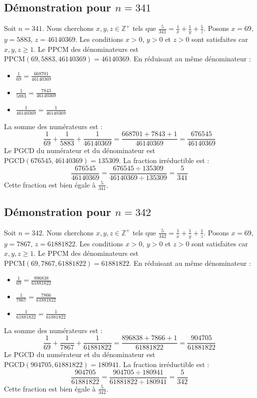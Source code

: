 \documentclass[11pt,a4paper]{article}
\begin{document}
\subsection{Démonstration pour $n = 341$}
Soit $n = 341$. Nous cherchons $x, y, z \in \mathbb{Z}^{+}$ tels que $\frac{5}{341} = \frac{1}{x} + \frac{1}{y} + \frac{1}{z}$.
Posons $x = 69$, $y = 5883$, $z = 46140369$.
Les conditions $x > 0$, $y > 0$ et $z > 0$ sont satisfaites car $x, y, z \geq 1$.
Le PPCM des dénominateurs est $\text{PPCM}(69, 5883, 46140369) = 46140369$.
En réduisant au même dénominateur :
\begin{itemize}
    \item $\frac{1}{69} = \frac{668701}{46140369}$
    \item $\frac{1}{5883} = \frac{7843}{46140369}$
    \item $\frac{1}{46140369} = \frac{1}{46140369}$
\end{itemize}
La somme des numérateurs est :
$$ \frac{1}{69} + \frac{1}{5883} + \frac{1}{46140369} = \frac{668701 + 7843 + 1}{46140369} = \frac{676545}{46140369} $$
Le PGCD du numérateur et du dénominateur est $\text{PGCD}(676545, 46140369) = 135309$.
La fraction irréductible est :
$$ \frac{676545}{46140369} = \frac{676545 \div 135309}{46140369 \div 135309} = \frac{5}{341} $$
Cette fraction est bien égale à $\frac{5}{341}$.

\subsection{Démonstration pour $n = 342$}
Soit $n = 342$. Nous cherchons $x, y, z \in \mathbb{Z}^{+}$ tels que $\frac{5}{342} = \frac{1}{x} + \frac{1}{y} + \frac{1}{z}$.
Posons $x = 69$, $y = 7867$, $z = 61881822$.
Les conditions $x > 0$, $y > 0$ et $z > 0$ sont satisfaites car $x, y, z \geq 1$.
Le PPCM des dénominateurs est $\text{PPCM}(69, 7867, 61881822) = 61881822$.
En réduisant au même dénominateur :
\begin{itemize}
    \item $\frac{1}{69} = \frac{896838}{61881822}$
    \item $\frac{1}{7867} = \frac{7866}{61881822}$
    \item $\frac{1}{61881822} = \frac{1}{61881822}$
\end{itemize}
La somme des numérateurs est :
$$ \frac{1}{69} + \frac{1}{7867} + \frac{1}{61881822} = \frac{896838 + 7866 + 1}{61881822} = \frac{904705}{61881822} $$
Le PGCD du numérateur et du dénominateur est $\text{PGCD}(904705, 61881822) = 180941$.
La fraction irréductible est :
$$ \frac{904705}{61881822} = \frac{904705 \div 180941}{61881822 \div 180941} = \frac{5}{342} $$
Cette fraction est bien égale à $\frac{5}{342}$.
\end{document}

